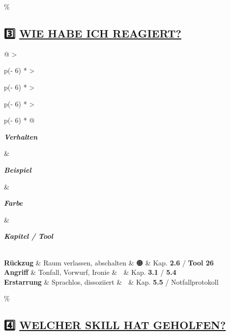 \hypertarget{wie-habe-ich-reagiert}{\%
\subsection{\texorpdfstring{3️⃣ \textbf{\ul{WIE HABE ICH REAGIERT?}}}{3️⃣ WIE HABE ICH REAGIERT?}}\label{wie-habe-ich-reagiert}}

\begin{longtable}[]{@{}
  >{\raggedright\arraybackslash}p{(\columnwidth - 6\tabcolsep) * }
  >{\raggedright\arraybackslash}p{(\columnwidth - 6\tabcolsep) * }
  >{\raggedright\arraybackslash}p{(\columnwidth - 6\tabcolsep) * }
  >{\raggedright\arraybackslash}p{(\columnwidth - 6\tabcolsep) * }@{}}
\toprule\noalign{}
\begin{minipage}[b]{\linewidth}\raggedright
\emph{\textbf{Verhalten}}
\end{minipage} \& \begin{minipage}[b]{\linewidth}\raggedright
\emph{\textbf{Beispiel}}
\end{minipage} \& \begin{minipage}[b]{\linewidth}\raggedright
\emph{\textbf{Farbe}}
\end{minipage} \& \begin{minipage}[b]{\linewidth}\raggedright
\emph{\textbf{Kapitel / Tool}}
\end{minipage} \\
\midrule\noalign{}
\endhead
\bottomrule\noalign{}
\endlastfoot
\textbf{Rückzug} \& Raum verlassen, abschalten \& 🟠 \& Kap. \textbf{2.6} / \textbf{Tool 26} \\
\textbf{Angriff} \& Tonfall, Vorwurf, Ironie \& 🔴 \& Kap. \textbf{3.1} / \textbf{5.4} \\
\textbf{Erstarrung} \& Sprachlos, dissoziiert \& 🔴 \& Kap. \textbf{5.5} / Notfallprotokoll \\
\end{longtable}

\hypertarget{welcher-skill-hat-geholfen}{\%
\subsection{\texorpdfstring{4️⃣ \textbf{\ul{WELCHER SKILL HAT GEHOLFEN?}}}{4️⃣ WELCHER SKILL HAT GEHOLFEN?}}\label{welcher-skill-hat-geholfen}}


